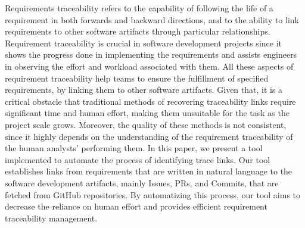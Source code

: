 \documentclass[conference]{IEEEtran}
\begin{document}

Requirements traceability refers to the capability of following the life of a requirement in both forwards and backward directions\cite{gotel-1994}, and to the ability to link requirements to other software artifacts through particular relationships. Requirement traceability is crucial in software development projects since it shows the progress done in implementing the requirements and assists engineers in observing the effort and workload associated with them. All these aspects of requirement traceability help teams to ensure the fulfillment of specified requirements, by linking them to other software artifacts. Given that, it is a critical obstacle that traditional methods of recovering traceability links require significant time and human effort, making them unsuitable for the task as the project scale grows. Moreover, the quality of these methods is not consistent, since it highly depends on the understanding of the requirement traceability of the human analysts' performing them. 
In this paper, we present a tool implemented to automate the process of identifying trace links. Our tool establishes links from requirements that are written in natural language to the software development artifacts, mainly Issues, PRs, and Commits, that are fetched from GitHub repositories. By automatizing this process, our tool aims to decrease the reliance on human effort and provides efficient requirement traceability management.
\end{document}

